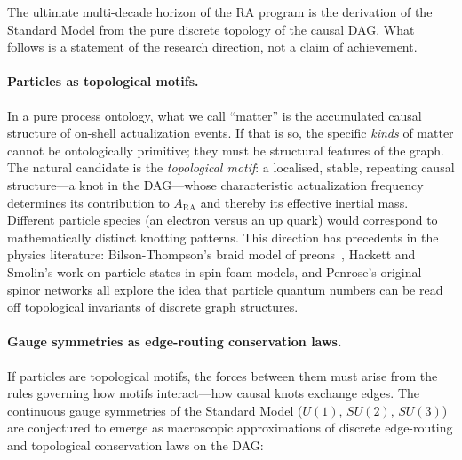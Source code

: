 \documentclass[11pt,a4paper]{article}
\theoremstyle{plain}
\theoremstyle{definition}
\theoremstyle{remark}
\begin{document}
The ultimate multi-decade horizon of the RA program is the derivation of the
Standard Model from the pure discrete topology of the causal DAG. What follows
is a statement of the research direction, not a claim of achievement.

\paragraph{Particles as topological motifs.}
In a pure process ontology, what we call ``matter'' is the accumulated causal
structure of on-shell actualization events. If that is so, the specific
\emph{kinds} of matter cannot be ontologically primitive; they must be structural
features of the graph. The natural candidate is the \emph{topological motif}: a
localised, stable, repeating causal structure---a knot in the DAG---whose
characteristic actualization frequency determines its contribution to $A_{\mathrm{RA}}$
and thereby its effective inertial mass. Different particle species (an electron
versus an up quark) would correspond to mathematically distinct knotting patterns.
This direction has precedents in the physics literature: Bilson-Thompson's braid
model of preons~\citep{BilsonThompson2006}, Hackett and Smolin's work on particle
states in spin foam models, and Penrose's original spinor networks all explore
the idea that particle quantum numbers can be read off topological invariants of
discrete graph structures.

\paragraph{Gauge symmetries as edge-routing conservation laws.}
If particles are topological motifs, the forces between them must arise from the
rules governing how motifs interact---how causal knots exchange edges. The
continuous gauge symmetries of the Standard Model ($U(1)$, $SU(2)$, $SU(3)$)
are conjectured to emerge as macroscopic approximations of discrete edge-routing
and topological conservation laws on the DAG:
\end{document}
